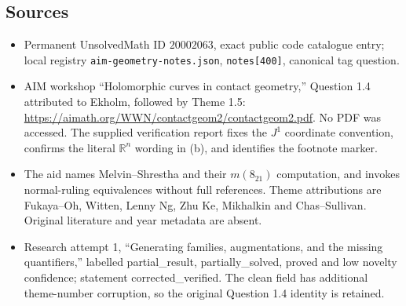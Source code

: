\documentclass[11pt]{article}
\newcommand{\R}{\mathbb{R}}
\begin{document}
\subsection{Sources}
\begin{itemize}
\item Permanent UnsolvedMath ID \(20002063\), exact public code catalogue entry; local registry \texttt{aim-geometry-notes.json}, \texttt{notes[400]}, canonical tag question.
\item AIM workshop ``Holomorphic curves in contact geometry,'' Question 1.4 attributed to Ekholm, followed by Theme 1.5: \url{https://aimath.org/WWN/contactgeom2/contactgeom2.pdf}. No PDF was accessed. The supplied verification report fixes the \(J^1\) coordinate convention, confirms the literal \(\R^n\) wording in (b), and identifies the footnote marker.
\item The aid names Melvin--Shrestha and their \(m(8_{21})\) computation, and invokes normal-ruling equivalences without full references. Theme attributions are Fukaya--Oh, Witten, Lenny Ng, Zhu Ke, Mikhalkin and Chas--Sullivan. Original literature and year metadata are absent.
\item Research attempt 1, ``Generating families, augmentations, and the missing quantifiers,'' labelled partial\_result, partially\_solved, proved and low novelty confidence; statement corrected\_verified. The clean field has additional theme-number corruption, so the original Question 1.4 identity is retained.
\end{itemize}
\end{document}
